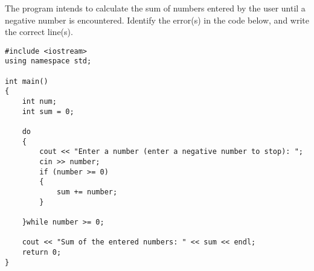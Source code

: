 \begin{multipart}
The program intends to calculate the sum of numbers entered by the user until a negative number is encountered. Identify the error(s) in the code below, and write the correct line(s).
\end{multipart}

\begin{verbatim}
#include <iostream>
using namespace std;

int main() 
{
    int num;
    int sum = 0;

    do 
    {
        cout << "Enter a number (enter a negative number to stop): ";
        cin >> number;
        if (number >= 0) 
        {
            sum += number;
        }

    }while number >= 0;

    cout << "Sum of the entered numbers: " << sum << endl;
    return 0;
}
\end{verbatim}

\newpage 

